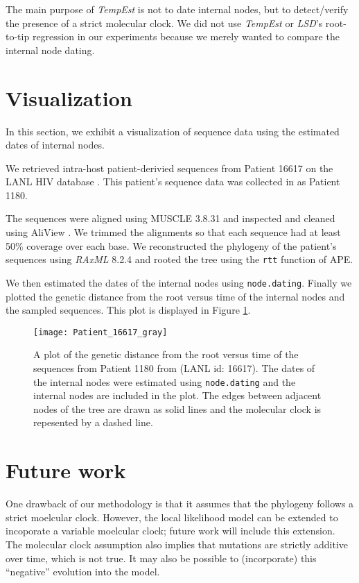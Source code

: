 \documentclass{bioinfo}
\newcommand{\code}[1]{{\tt #1}}
\begin{document}
The main purpose of \emph{TempEst} is not to date internal nodes, but to detect/verify the presence of a strict molecular clock.
We did not use \emph{TempEst} or \emph{LSD}'s root-to-tip regression in our experiments because we merely wanted to compare the internal node dating.

\section{Visualization}
In this section, we exhibit a visualization of sequence data using the estimated dates of internal nodes.

We retrieved intra-host patient-derivied sequences from Patient 16617 on the LANL HIV database \citep{LosAlamos}.
This patient's sequence data was collected in \cite{Llewellyn06} as Patient 1180.

The sequences were aligned using MUSCLE 3.8.31 \citep{Muscle04} and inspected and cleaned using AliView \citep{AliView14}. 
We trimmed the alignments so that each sequence had at least 50\% coverage over each base.
We reconstructed the phylogeny of the patient's sequences using \emph{RAxML} 8.2.4 \citep{Raxml14} and rooted the tree using the \code{rtt} function of APE.

We then estimated the dates of the internal nodes using \code{node.dating}. Finally we plotted the genetic distance from the root versus time of the internal nodes and the sampled sequences. This plot is displayed in Figure \ref{fig:pat16617}.

\begin{figure}[t]
	\centering
	\texttt{[image: Patient\_16617\_gray]}
	\caption[Genetic distance versus time plot]{A plot of the genetic distance from the root versus time of the sequences from Patient 1180 from \cite{Llewellyn06} (LANL id: 16617). The dates of the internal nodes were estimated using \code{node.dating} and the internal nodes are included in the plot. The edges between adjacent nodes of the tree are drawn as solid lines and the molecular clock is repesented by a dashed line.}
	\label{fig:pat16617}
\end{figure}

\section{Future work} \label{sec:discuss}
One drawback of our methodology is that it assumes that the phylogeny follows a strict moelcular clock.
However, the local likelihood model can be extended to incoporate a variable moelcular clock; future work will include this extension.
The molecular clock assumption also implies that mutations are strictly additive over time, which is not true.
It may also be possible to (incorporate) this ``negative'' evolution into the model.
\end{document}
